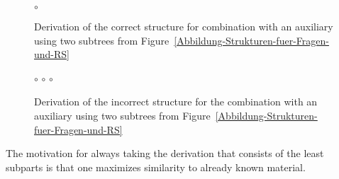 \begin{figure}
\hfill
{}
\hfill
$\circ$
\hfill
\hspace{5mm}
\hfill\mbox{}
\caption{\label{Abbildung-Kombination-fuer-grammatischen-Satz}Derivation of the correct structure for combination with an auxiliary using two subtrees from
Figure~\ref{Abbildung-Strukturen-fuer-Fragen-und-RS}}
\end{figure}%
%
%
%
%
\begin{figure}
\hfill
{}
\hfill
$\circ$
\hfill
{}
\hfill
$\circ$
\hfill
{}
\hfill
$\circ$
\hfill
{}
\hfill\mbox{}
\caption{\label{Abbildung-Kombination-fuer-ungrammatischen-Satz}Derivation of the incorrect structure
for the combination with an auxiliary using two subtrees from Figure~\ref{Abbildung-Strukturen-fuer-Fragen-und-RS}}
\end{figure}%

The motivation for always taking the derivation that consists of the least subparts is that one maximizes similarity to already known material.

